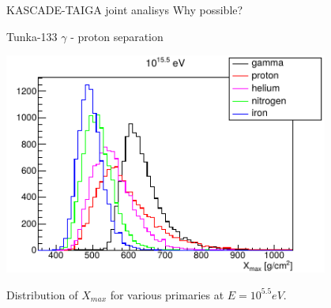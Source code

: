 
% 

\begin{frame}{KASCADE-TAIGA joint analisys}
 Why possible?
\end{frame}

\begin{frame}{Tunka-133 $\gamma$ - proton separation}
    \begin{center}
	\includegraphics[width=0.8\textwidth]{pics/tunka_gamma_cr_diff.pdf}
	
      Distribution of $X_{max}$ for various primaries at $E = 10^{5.5} eV$.
    \end{center}
\end{frame}

